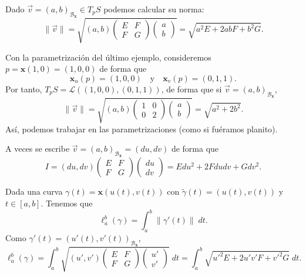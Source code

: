 \begin{observation}
	Dado $\displaystyle \vec{v} = \left(a,b\right)_{\mathcal{B}_{ \textbf{x} }}\in T_{p}S $ podemos calcular su norma:
	\[ \|\vec{v}\| = \sqrt{\left(a,b\right)\begin{pmatrix} E & F \\ F & G \end{pmatrix}\begin{pmatrix} a \\ b \end{pmatrix}} = \sqrt{a^{2}E + 2ab F + b^{2}G} .\]
\end{observation}
\begin{eg}
Con la parametrización del último ejemplo, consideremos $\displaystyle p = \textbf{x} \left(1,0\right) = \left(1,0,0\right) $ de forma que 
\[ \textbf{x} _{u}\left(p\right)=\left(1,0,0\right) \quad \text{y} \quad \textbf{x} _{v}\left(p\right)=\left(0,1,1\right) .\]
Por tanto, $\displaystyle T_{p}S = \mathcal{L}\left(\left(1,0,0\right), \left(0,1,1\right)\right) $, de forma que si $\displaystyle \vec{v}=\left(a,b\right)_{ \mathcal{B}_{ \textbf{x} }} $, 
\[ \|\vec{v}\| = \sqrt{\left(a,b\right)\begin{pmatrix} 1 & 0 \\ 0 & 2 \end{pmatrix}\begin{pmatrix} a \\ b \end{pmatrix}} = \sqrt{a^{2}+2b^{2}} .\]
Así, podemos trabajar en las parametrizaciones (como si fuéramos planito).
\end{eg}
\begin{notation}
A veces se escribe $\displaystyle \vec{v}=\left(a,b\right)_{\mathcal{B}_{ \textbf{x} }} = \left(du, dv\right) $ de forma que 
\[I = \left(du, dv\right) \begin{pmatrix} E & F \\ F & G \end{pmatrix}\begin{pmatrix} du \\ dv \end{pmatrix}=Edu^{2} + 2Fdudv + Gdv^{2} .\]
\end{notation}
\begin{observation}
	Dada una curva $\displaystyle \gamma\left(t\right)= \textbf{x} \left(u\left(t\right), v\left(t\right)\right) $ con $\displaystyle \tilde{\gamma}\left(t\right)=\left(u\left(t\right), v\left(t\right)\right) $ y $\displaystyle t \in [a,b] $. Tenemos que 
	\[\ell^{b}_{a}\left(\gamma \right)=\int^{b}_{a} \|\gamma'\left(t\right)\| \; dt  .\]
Como $\displaystyle \gamma'\left(t\right)=\left(u'\left(t\right), v'\left(t\right)\right)_{\mathcal{B}_{ \textbf{x} }} $,
\[\ell^{b}_{a}\left(\gamma \right)=\int^{b}_{a} \sqrt{\left(u',v'\right)\begin{pmatrix} E & F \\ F & G \end{pmatrix}\begin{pmatrix} u' \\ v' \end{pmatrix}} \; dt = \int^{b}_{a} \sqrt{u'^{2}E + 2u'v'F + v'^{2}G} \; dt .\]
\end{observation}
